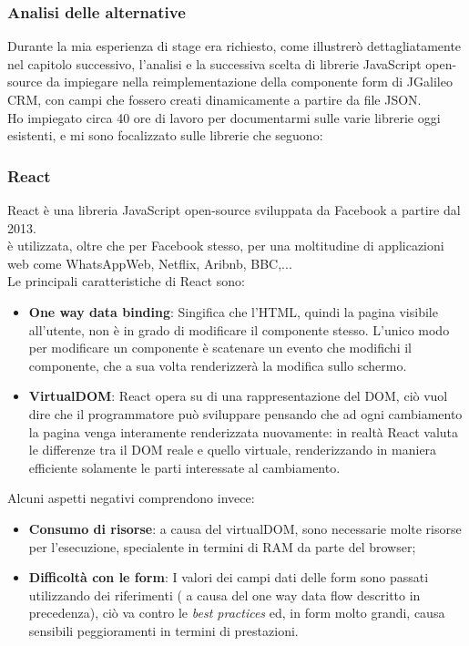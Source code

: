 \subsubsection{Analisi delle alternative}
Durante la mia esperienza di stage era richiesto, come illustrerò dettagliatamente nel capitolo successivo, l'analisi e la successiva scelta di librerie JavaScript open-source da impiegare nella reimplementazione della componente form di JGalileo CRM, con campi che fossero creati dinamicamente a partire da file JSON. \\ 
Ho impiegato circa 40 ore di lavoro per documentarmi sulle varie librerie oggi esistenti, e mi sono focalizzato sulle librerie che seguono:
\subsubsection{React}
React è una libreria JavaScript open-source sviluppata da Facebook a partire dal 2013.\\
è utilizzata, oltre che per Facebook stesso, per una moltitudine di applicazioni web come WhatsAppWeb, Netflix, Aribnb, BBC,...\\
Le principali caratteristiche di React sono:
\begin{itemize}
	\item \textbf{One way data binding}: Singifica che l'HTML, quindi la pagina visibile all'utente, non è in grado di modificare il componente stesso. L'unico modo per modificare un componente è scatenare un evento che modifichi il componente, che a sua volta renderizzerà la modifica sullo schermo.
	\item \textbf{VirtualDOM}: React opera su di una rappresentazione del \gls{DOM}, ciò vuol dire che il programmatore può sviluppare pensando che ad ogni cambiamento la pagina venga interamente renderizzata nuovamente: in realtà React valuta le differenze tra il DOM reale e quello virtuale, renderizzando in maniera efficiente solamente le parti interessate al cambiamento.
\end{itemize}
Alcuni aspetti negativi comprendono invece:
\begin{itemize}
	\item \textbf{Consumo di risorse}: a causa del virtualDOM, sono necessarie molte risorse per l'esecuzione, specialente in termini di RAM da parte del browser;
	\item \textbf{Difficoltà con le form}: I valori dei campi dati delle form sono passati utilizzando dei riferimenti ( a causa del one way data flow descritto in precedenza), ciò va contro le \emph{best practices} ed, in form molto grandi, causa sensibili peggioramenti in termini di prestazioni.
\end{itemize}
